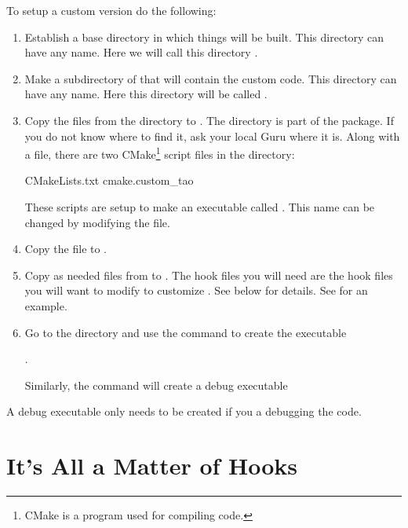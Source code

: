 To setup a custom \tao version do the following:
  \begin{enumerate}
  \item
Establish a base directory in which things will be built. This directory can have any name. Here we
will call this directory .
  \item
Make a subdirectory of  that will contain the custom code.  This directory can have any
name.  Here this directory will be called .
  \item
Copy the files from the directory  to . The 
directory is part of the \bmad package. If you do not know where to find it, ask your local Guru
where it is. Along with a  file, there are two CMake\footnote
  {
CMake is a program used for compiling code.
  } 
script files in the  directory:
\begin{example}
  CMakeLists.txt
  cmake.custom_tao
\end{example}
These scripts are setup to make an executable called . This name can be changed by
modifying the  file.
  \item
Copy the file  to .
  \item
Copy as needed  files from  to . The hook files you will
need are the hook files you will want to modify to customize \tao. See below for details. See
 for an example.
  \item
Go to the  directory and use the command  to create the
executable 
\begin{example}
    . 
\end{example}
Similarly, the command  will create a debug executable 
\begin{example}
\end{example}
	\end{enumerate}
A debug executable only needs to be created if you a debugging the code.

\section{It's All a Matter of Hooks}

